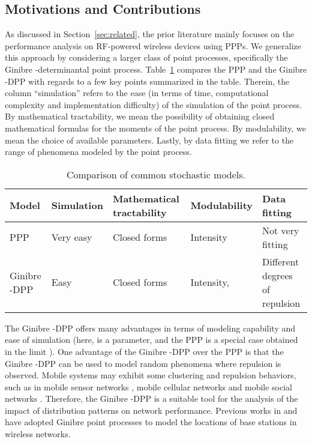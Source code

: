 \documentclass[12pt,draftclsnofoot,onecolumn]{IEEEtran}
\begin{document}
\subsection{Motivations and Contributions}

As discussed in Section~\ref{sec:related}, the prior literature mainly focuses on the performance analysis on RF-powered wireless devices using PPPs. We generalize this approach by considering a larger class of point processes, specifically the Ginibre -determinantal point process. 
Table~\ref{tab:comparisonpp} compares the PPP and the Ginibre -DPP with regards to a few key points summarized in the table. Therein, the column ``simulation'' refers to the ease (in terms of time, computational complexity and implementation difficulty) of the simulation of the point process. By mathematical tractability, we mean the possibility of obtaining closed mathematical formulas for the moments of the point process. By modulability, we mean the choice of available parameters. Lastly, by data fitting we refer to the range of phenomena modeled by the point process. 


\begin{table}
\centering
\caption{\footnotesize Comparison of common stochastic models.} \label{tab:comparisonpp}
\begin{tabular}{|l|l|l|l|l|} 
\hline
Model & Simulation & Mathematical tractability & Modulability & Data fitting\\ \hline
\hline
PPP & Very easy & Closed forms & Intensity & Not very fitting \\
\hline                                   
Ginibre -DPP & Easy & Closed forms & Intensity,  & Different degrees of repulsion\\
\hline                   
\end{tabular}
\end{table}

The Ginibre -DPP offers many advantages in terms of modeling capability and ease of simulation \cite{DecreusefondFlintVergne} (here,  is a parameter, and the PPP is a special case obtained in the limit ). One advantage of the Ginibre -DPP over the PPP is that the Ginibre -DPP can be used to model random phenomena where repulsion is observed. Mobile systems may exhibit some clustering and repulsion behaviors, such as in mobile sensor networks \cite{A.A2007Abbasi}, mobile cellular networks \cite{S2013Cho} and mobile social networks \cite{N2014Vastardis}. Therefore, the Ginibre -DPP is a suitable tool for the analysis of the impact of distribution patterns on network performance. Previous works in \cite{N.2012Miyoshi} and \cite{N.Deng2014} have adopted Ginibre point processes to model the locations of base stations in wireless networks. 
 
\end{document}
